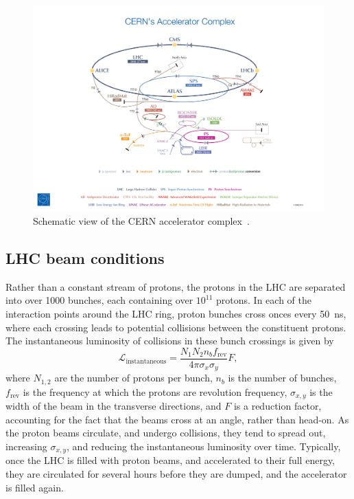 \begin{figure}[ht]
  \centering
  \includegraphics[width=\textwidth, clip=true, trim=15cm 0 15cm 10cm]
    {figs/lhc/accelerator_complex.jpg}
  \caption{
    Schematic view of the CERN accelerator complex~\cite{Marcastel:1621583}.
  }
  \label{fig:cern_complex}
\end{figure}

\FloatBarrier
\subsection{LHC beam conditions}
\label{sec:beam_conditions}

Rather than a constant stream of protons, the protons in the LHC are separated
into over 1000 bunches, each containing over $10^{11}$ protons.
In each of the interaction points around the LHC ring, proton bunches cross
onces every 50~ns, where each crossing leads to potential collisions between
the constituent protons.
The instantaneous luminosity of collisions in these bunch crossings is given by
\begin{equation}
  \mathcal{L}_\mathrm{instantaneous} =
  \frac{N_{1}N_{2} n_b f_\mathrm{rev}}
  {4\pi \sigma_{x} \sigma_{y}}
  F,
\end{equation}
where $N_{1,2}$ are the number of protons per bunch, $n_b$ is the number of
bunches, $f_\mathrm{rev}$ is the frequency at which the protons are revolution
frequency, $\sigma_{x,y}$ is the width of the beam in the transverse directions,
and $F$ is a reduction factor, accounting for the fact that the beams cross
at an angle, rather than head-on.
As the proton beams circulate, and undergo collisions, they tend to spread out,
increasing $\sigma_{x,y}$, and reducing the instantaneous luminosity over time.
Typically, once the LHC is filled with proton beams, and accelerated to their
full energy, they are circulated for several hours before they are dumped, and
the accelerator is filled again.

